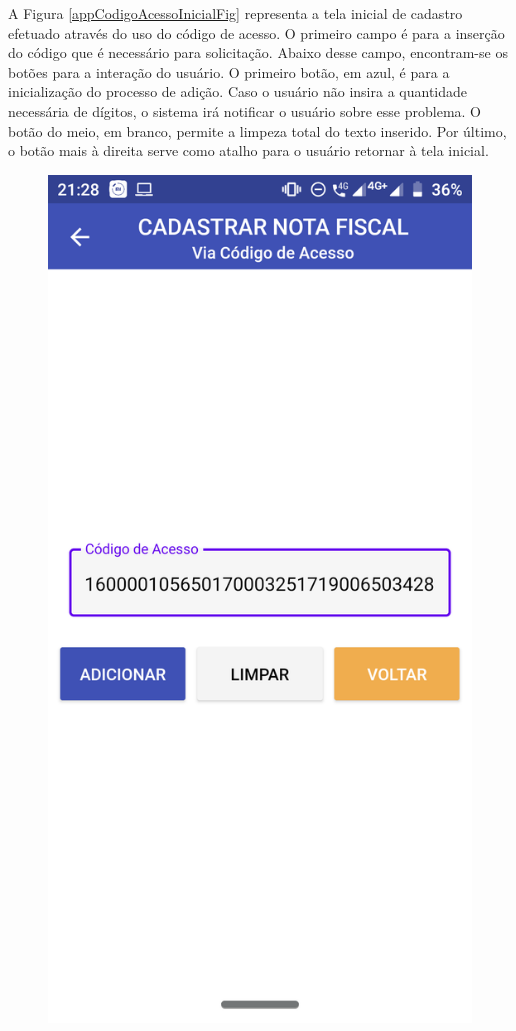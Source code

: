 A Figura \ref{appCodigoAcessoInicialFig} representa a tela inicial de cadastro efetuado através do uso do código de acesso. O primeiro campo é para a inserção do código que é necessário para solicitação. Abaixo desse campo, encontram-se os botões para a interação do usuário. O primeiro botão, em azul, é para a inicialização do processo de adição. Caso o usuário não insira a quantidade necessária de dígitos, o sistema irá notificar o usuário sobre esse problema. O botão do meio, em branco, permite a limpeza total do texto inserido. Por último, o botão mais à direita serve como atalho para o usuário retornar à tela inicial.

\newpage
\begin{figure}[h]
    \centering
    \includegraphics[scale=0.15]{tcc/figures/app/app_codigo_acesso_com_codigo.png}

\end{figure}
